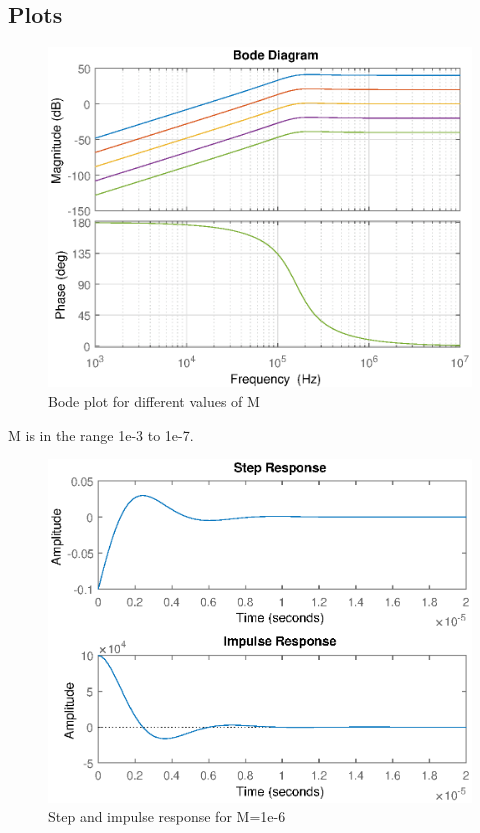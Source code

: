 
\newpage
\subsection{Plots}

\begin{figure}[h]
    \centering
    \includegraphics[width=\textwidth]{img/CoilRigBode_M.eps}
    \caption{Bode plot for different values of M}
    \label{fig:my_label}
\end{figure}
M is in the range 1e-3 to 1e-7.

\begin{figure}
    \centering
    \includegraphics[width=\textwidth]{img/CoilRigResponse.eps}
    \caption{Step and impulse response for M=1e-6}
    \label{fig:my_label}
\end{figure}

